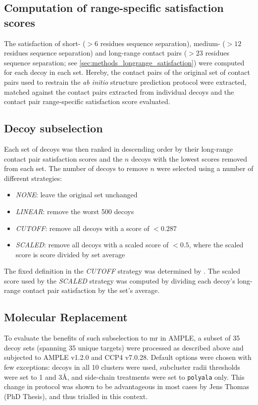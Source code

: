 \subsection{Computation of range-specific satisfaction scores}
The satisfaction of short- ($>6$ residues sequence separation), medium- ($>12$ residues sequence separation) and long-range contact pairs ($>23$ residues sequence separation; see \cref{sec:methods_longrange_satisfaction}) were computed for each decoy in each set. Hereby, the contact pairs of the original set of contact pairs used to restrain the \textit{ab initio} structure prediction protocol were extracted, matched against the contact pairs extracted from individual decoys and the contact pair range-specific satisfaction score evaluated. 

\subsection{Decoy subselection} \label{sec:ample_decoys_decoy_selection}
Each set of decoys was then ranked in descending order by their long-range contact pair satisfaction scores and the $n$ decoys with the lowest scores removed from each set. The number of decoys to remove $n$ were selected using a number of different strategies:

\begin{itemize}
    \item \textit{NONE}: leave the original set unchanged
    \item \textit{LINEAR}: remove the worst 500 decoys
    \item \textit{CUTOFF}: remove all decoys with a score of $<0.287$ 
    \item \textit{SCALED}: remove all decoys with a scaled score of $<0.5$, where the scaled score is score divided by set average
\end{itemize}

The fixed definition in the \textit{CUTOFF} strategy was determined by \textcite{De_Oliveira2017-gj}. The scaled score used by the \textit{SCALED} strategy was computed by dividing each decoy's long-range contact pair satisfaction by the set's average.

\subsection{Molecular Replacement} \label{subsec:ample_decoys_methods_mr}
To evaluate the benefits of such subselection to \gls{mr} in AMPLE, a subset of 35 decoy sets (spanning 35 unique targets) were processed as described above and subjected to AMPLE v1.2.0 and CCP4 v7.0.28. Default options were chosen with few exceptions: decoys in all 10 clusters were used, subcluster radii thresholds were set to 1 and 3\AA, and side-chain treatments were set to \texttt{polyala} only. This change in protocol was shown to be advantageous in most cases by Jens Thomas (PhD Thesis), and thus trialled in this context. 

